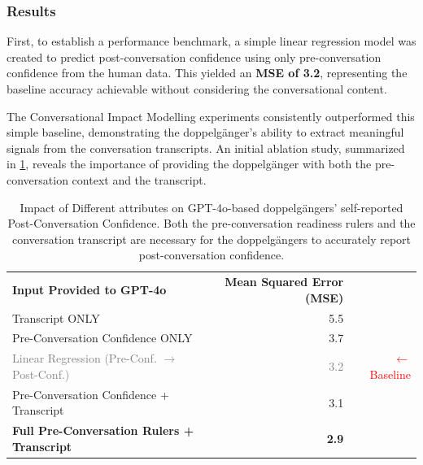 \subsubsection{Results}
First, to establish a performance benchmark, a simple linear regression model was created to predict post-conversation confidence using only pre-conversation confidence from the human data. This yielded an \textbf{MSE of 3.2}, representing the baseline accuracy achievable without considering the conversational content.

The Conversational Impact Modelling experiments consistently outperformed this simple baseline, demonstrating the doppelgänger's ability to extract meaningful signals from the conversation transcripts. An initial ablation study, summarized in \cref{tab:ablation_results}, reveals the importance of providing the doppelgänger with both the pre-conversation context and the transcript.



\begin{table}[ht!]
\centering

\begin{tabular}{@{}lrr@{}}
\cmidrule(r){1-2}
\textbf{Input Provided to GPT-4o} & \textbf{Mean Squared Error (MSE)} & \\
\cmidrule(r){1-2}
Transcript ONLY & 5.5 & \\
Pre-Conversation Confidence ONLY & 3.7 & \\
\textcolor{gray}{Linear Regression (Pre-Conf. $\rightarrow$ Post-Conf.)} & \textcolor{gray}{ 3.2} & \textcolor{red}{\small $\leftarrow$ Baseline} \\
Pre-Conversation Confidence + Transcript & 3.1 & \\
\textbf{Full Pre-Conversation Rulers + Transcript} & \textbf{2.9} & \\
\cmidrule(r){1-2}
\end{tabular}
\caption[Ablation Study on doppelgängers' self-reported post-conversation confidence]{Impact of Different attributes on GPT-4o-based doppelgängers' self-reported Post-Conversation Confidence. Both the pre-conversation readiness rulers and the conversation transcript are necessary for the doppelgängers to accurately report post-conversation confidence.}
\label{tab:ablation_results}
\end{table}



